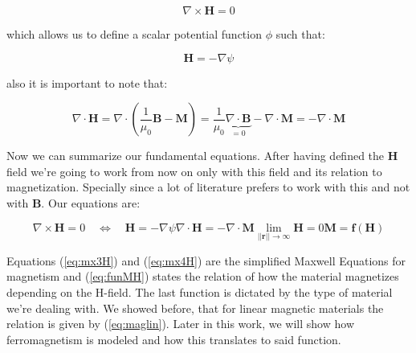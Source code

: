 \begin{equation}
\nabla\times\textbf{H}=  0 
\end{equation}

which allows us to define a scalar potential function $\phi$ such that:

\begin{equation}\label{eq:magscalarpot}
\textbf{H} =- \nabla\psi
\end{equation}

also it is important to note that:

\begin{equation}
\nabla\cdot\textbf{H} = \nabla\cdot(\frac{1}{\mu_0}\textbf{B} - \textbf{M}) = \frac{1}{\mu_0}\underbrace{\nabla\cdot\textbf{B}}_{=0} - \nabla\cdot\textbf{M} =-\nabla\cdot\textbf{M}
\end{equation}


Now we can summarize our fundamental equations. After having defined the $\textbf{H}$ field we're going to work from now on only with this field and its relation to magnetization. Specially since a lot of literature prefers to work with this and not with $\textbf{B}$. Our equations are:

\begin{subequations}\label{eq:mxH}
\begin{equation}\label{eq:mx4H}
\nabla\times\textbf{H}=  0 \quad\Leftrightarrow \quad \textbf{H} =- \nabla\psi
\end{equation}
\begin{equation}\label{eq:mx3H}
\nabla\cdot\textbf{H} = -\nabla\cdot\textbf{M}
\end{equation}
\begin{equation}\label{eq:mx34Hbc}
\lim_{||\textbf{r}||  \rightarrow \infty} \textbf{H} =0
\end{equation}
\begin{equation}\label{eq:funMH}
\textbf{M} = \textbf{f}(\textbf{H})
\end{equation}
\end{subequations}

Equations (\ref{eq:mx3H}) and (\ref{eq:mx4H}) are the simplified Maxwell Equations for magnetism and (\ref{eq:funMH}) states the relation of how the material magnetizes depending on the H-field. The last function is dictated by the type of material we're dealing with. We showed before, that for linear magnetic materials the relation is given by (\ref{eq:maglin}). Later in this work, we will show how ferromagnetism is modeled and how this translates to said function.\\

